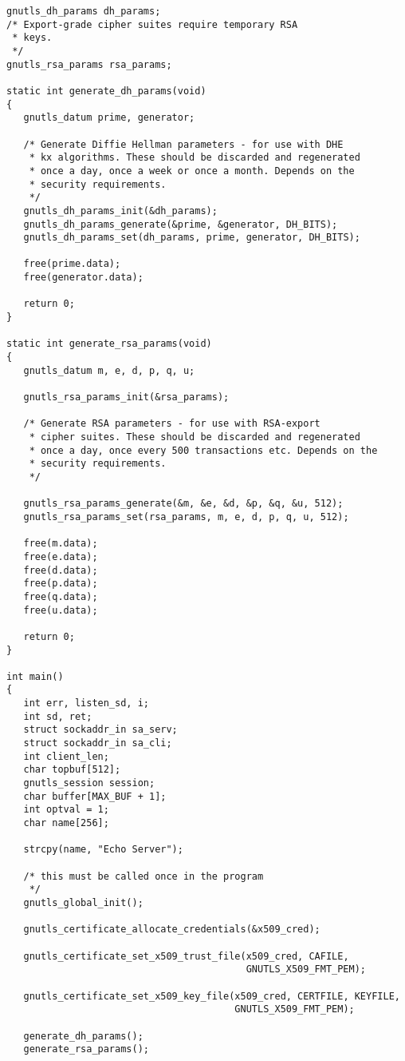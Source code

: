 \begin{verbatim}
gnutls_dh_params dh_params;
/* Export-grade cipher suites require temporary RSA
 * keys.
 */
gnutls_rsa_params rsa_params;

static int generate_dh_params(void)
{
   gnutls_datum prime, generator;

   /* Generate Diffie Hellman parameters - for use with DHE
    * kx algorithms. These should be discarded and regenerated
    * once a day, once a week or once a month. Depends on the
    * security requirements.
    */
   gnutls_dh_params_init(&dh_params);
   gnutls_dh_params_generate(&prime, &generator, DH_BITS);
   gnutls_dh_params_set(dh_params, prime, generator, DH_BITS);

   free(prime.data);
   free(generator.data);
   
   return 0;
}

static int generate_rsa_params(void)
{
   gnutls_datum m, e, d, p, q, u;

   gnutls_rsa_params_init(&rsa_params);

   /* Generate RSA parameters - for use with RSA-export
    * cipher suites. These should be discarded and regenerated
    * once a day, once every 500 transactions etc. Depends on the
    * security requirements.
    */

   gnutls_rsa_params_generate(&m, &e, &d, &p, &q, &u, 512);
   gnutls_rsa_params_set(rsa_params, m, e, d, p, q, u, 512);

   free(m.data);
   free(e.data);
   free(d.data);
   free(p.data);
   free(q.data);
   free(u.data);

   return 0;
}

int main()
{
   int err, listen_sd, i;
   int sd, ret;
   struct sockaddr_in sa_serv;
   struct sockaddr_in sa_cli;
   int client_len;
   char topbuf[512];
   gnutls_session session;
   char buffer[MAX_BUF + 1];
   int optval = 1;
   char name[256];

   strcpy(name, "Echo Server");

   /* this must be called once in the program
    */
   gnutls_global_init();

   gnutls_certificate_allocate_credentials(&x509_cred);

   gnutls_certificate_set_x509_trust_file(x509_cred, CAFILE,
                                          GNUTLS_X509_FMT_PEM);

   gnutls_certificate_set_x509_key_file(x509_cred, CERTFILE, KEYFILE,
                                        GNUTLS_X509_FMT_PEM);

   generate_dh_params();
   generate_rsa_params();


\end{verbatim}

